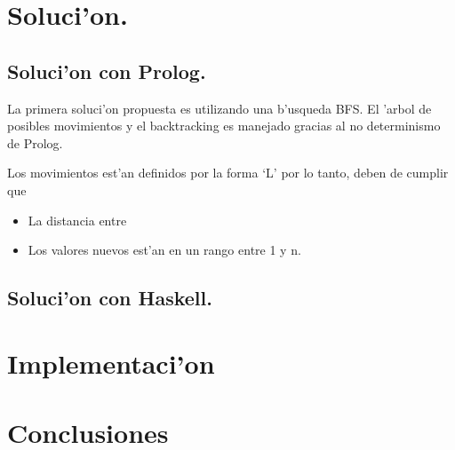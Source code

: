 \documentclass[11pt]{article}
\begin{document}
    \section{Soluci'on.}

    \subsection{Soluci'on con Prolog.}
    La primera soluci'on propuesta es utilizando una b'usqueda BFS.
    El 'arbol de posibles movimientos y el backtracking es manejado
    gracias al no determinismo de Prolog.

    Los movimientos est'an definidos por la forma `L' \; por lo tanto, deben de cumplir
    que
    \begin{itemize}
        \item La distancia entre
        \item Los valores nuevos est'an en un rango entre 1 y n.
    \end{itemize}

    \subsection{Soluci'on con Haskell.}

    \section{Implementaci'on}
    
    \section{Conclusiones}
\end{document}
